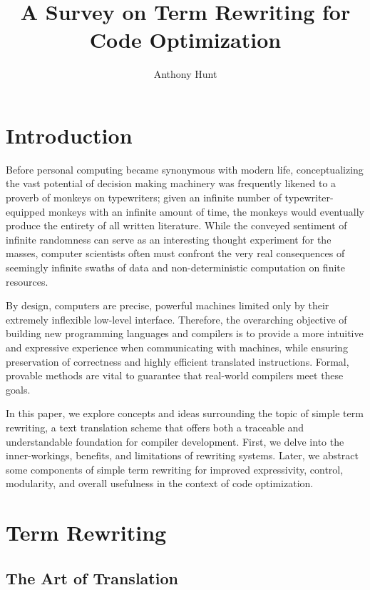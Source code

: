 \documentclass{article}
\title{A Survey on Term Rewriting for Code Optimization}
\author{Anthony Hunt}
\begin{document}
\maketitle
\tableofcontents
\newpage

\section{Introduction}
Before personal computing became synonymous with modern life,
conceptualizing the vast potential of decision making machinery
was frequently likened to a proverb of monkeys on typewriters;
given an infinite number of typewriter-equipped monkeys with an infinite amount of time, the monkeys would eventually produce the entirety of all written literature.
While the conveyed sentiment of infinite randomness can serve as an interesting thought experiment for the masses,
computer scientists often must confront the very real consequences of seemingly infinite swaths of data and non-deterministic computation on finite resources.

By design,
computers are precise, powerful machines limited only by
their extremely inflexible low-level interface.
Therefore, the overarching objective of building new programming languages and compilers
is to provide a more intuitive and expressive experience when communicating with machines,
while ensuring preservation of correctness and
highly efficient translated instructions.
Formal, provable methods are vital to guarantee that
real-world compilers meet these goals.

In this paper, we explore concepts and ideas surrounding the topic of simple term rewriting,
a text translation scheme that offers both a traceable and understandable foundation for compiler development.
First, we delve into the inner-workings, benefits, and limitations of rewriting systems. Later,
we abstract some components of simple term rewriting for improved expressivity, control,
modularity, and overall usefulness in the context of code optimization.

\section{Term Rewriting}

\subsection{The Art of Translation}
\end{document}
